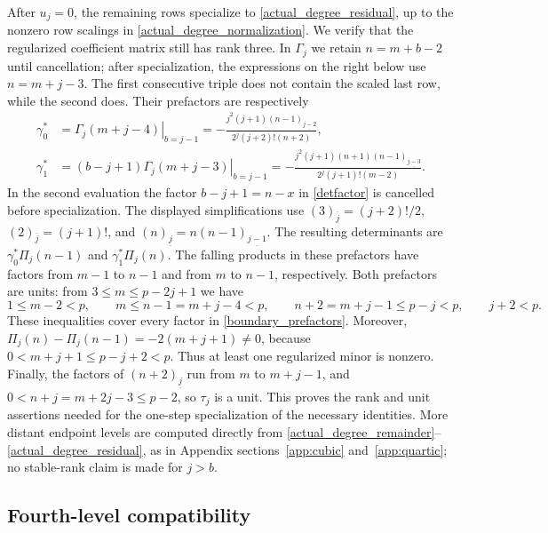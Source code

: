 \documentclass[10pt,a4paper]{amsart}
\newcommand{\fall}[2]{(#1)_{\underline{#2}}}
\newcommand{\rise}[2]{(#1)_{\overline{#2}}}
\begin{document}
After $u_j=0$, the remaining rows specialize to
\eqref{actual_degree_residual}, up to the nonzero row scalings in
\eqref{actual_degree_normalization}.  We verify that the regularized coefficient matrix still has rank
three.  In $\Gamma_j$ we retain
$n=m+b-2$ until cancellation; after specialization, the expressions
on the right below use $n=m+j-3$.  The first consecutive triple does
not contain the scaled last row, while the second does.  Their
prefactors are respectively
\begin{equation}\label{boundary_prefactors}
\begin{aligned}
 \gamma_0^*
 &=\left.\Gamma_j(m+j-4)\right|_{b=j-1}
   =-\frac{j^2(j+1)\fall{n-1}{j-2}}
            {2^j(j+2)!(n+2)},\\
 \gamma_1^*
 &=\left.(b-j+1)\Gamma_j(m+j-3)\right|_{b=j-1}
   =-\frac{j^2(j+1)(n+1)\fall{n-1}{j-3}}
            {2^j(j+1)!(m-2)}.
\end{aligned}
\end{equation}
In the second evaluation the factor $b-j+1=n-x$ in
\eqref{detfactor} is cancelled before specialization.  The displayed
simplifications use
$\rise{3}{j}=(j+2)!/2$, $\rise{2}{j}=(j+1)!$, and
$\fall{n}{j}=n\fall{n-1}{j-1}$.
The resulting determinants are
$\gamma_0^*\Pi_j(n-1)$ and $\gamma_1^*\Pi_j(n)$.
The falling products in these prefactors have factors from $m-1$ to
$n-1$ and from $m$ to $n-1$, respectively.  Both prefactors are units:
from $3\le m\le p-2j+1$ we have
\[
 1\le m-2<p,\qquad
 m\le n-1=m+j-4<p,\qquad
 n+2=m+j-1\le p-j<p,\qquad j+2<p.
\]
These inequalities cover every factor in \eqref{boundary_prefactors}.
Moreover, $\Pi_j(n)-\Pi_j(n-1)=-2(m+j+1)\ne0$, because $0<m+j+1\le p-j+2<p$.  Thus at least one regularized
minor is nonzero.  Finally, the factors of $\fall{n+2}{j}$ run from
$m$ to $m+j-1$, and $0<n+j=m+2j-3\le p-2$, so $\tau_j$ is a unit.
This proves the rank and unit assertions needed for the one-step
specialization of the necessary identities.  More distant
endpoint levels are computed directly from
\eqref{actual_degree_remainder}--\eqref{actual_degree_residual}, as in
Appendix sections~\ref{app:cubic} and~\ref{app:quartic}; no stable-rank claim
is made for $j>b$.

\subsection{Fourth-level compatibility}\label{app:fourth}
\end{document}
